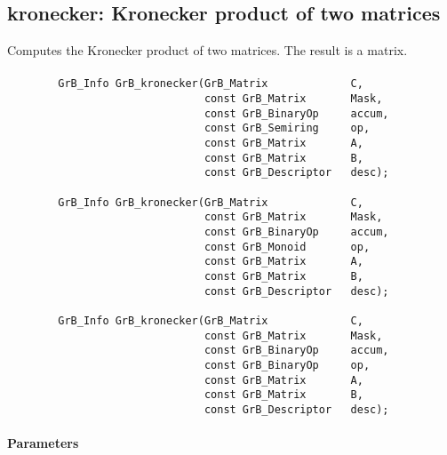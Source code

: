 \subsection{{\sf kronecker}: Kronecker product of two matrices}

Computes the Kronecker product of two matrices. The result is a matrix.

\paragraph{\syntax}

\begin{verbatim}
        GrB_Info GrB_kronecker(GrB_Matrix             C,
                               const GrB_Matrix       Mask,
                               const GrB_BinaryOp     accum,
                               const GrB_Semiring     op,
                               const GrB_Matrix       A,
                               const GrB_Matrix       B,
                               const GrB_Descriptor   desc);

        GrB_Info GrB_kronecker(GrB_Matrix             C,
                               const GrB_Matrix       Mask,
                               const GrB_BinaryOp     accum,
                               const GrB_Monoid       op,
                               const GrB_Matrix       A,
                               const GrB_Matrix       B,
                               const GrB_Descriptor   desc);

        GrB_Info GrB_kronecker(GrB_Matrix             C,
                               const GrB_Matrix       Mask,
                               const GrB_BinaryOp     accum,
                               const GrB_BinaryOp     op,
                               const GrB_Matrix       A,
                               const GrB_Matrix       B,
                               const GrB_Descriptor   desc);
\end{verbatim}

\paragraph{Parameters}


